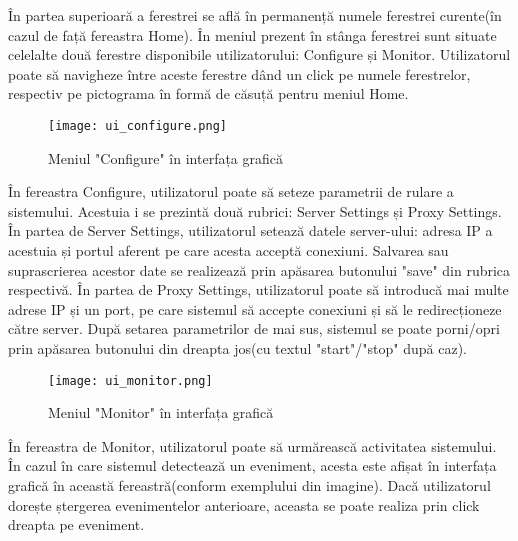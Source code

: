 În partea superioară a ferestrei se află în permanență numele ferestrei curente(în cazul de față fereastra Home). În meniul prezent în stânga ferestrei sunt situate celelalte două ferestre disponibile utilizatorului: Configure și Monitor. Utilizatorul poate să navigheze între aceste ferestre dând un click pe numele ferestrelor, respectiv pe pictograma în formă de căsuță pentru meniul Home.  \\

\begin{figure}[h]
	\centering
	\texttt{[image: ui\_configure.png]}
	\caption{ Meniul "Configure" în interfața grafică }
	\label{fig:ui_configure}
\end{figure}

În fereastra Configure, utilizatorul poate să seteze parametrii de rulare a sistemului. Acestuia i se prezintă două rubrici: Server Settings și Proxy Settings. În partea de Server Settings, utilizatorul setează datele server-ului: adresa IP a acestuia și portul aferent pe care acesta acceptă conexiuni. Salvarea sau suprascrierea acestor date se realizează prin apăsarea butonului "save" din rubrica respectivă. În partea de Proxy Settings, utilizatorul poate să introducă mai multe adrese IP și un port, pe care sistemul să accepte conexiuni și să le redirecționeze către server. După setarea parametrilor de mai sus, sistemul se poate porni/opri prin apăsarea butonului din dreapta jos(cu textul "start"/"stop" după caz). 
\newpage
\begin{figure}[h]
	\centering
	\texttt{[image: ui\_monitor.png]}
	\caption{ Meniul "Monitor" în interfața grafică }
	\label{fig:ui_monitor}
\end{figure}

În fereastra de Monitor, utilizatorul poate să urmărească activitatea sistemului. În cazul în care sistemul detectează un eveniment, acesta este afișat în interfața grafică în această fereastră(conform exemplului din imagine). Dacă utilizatorul dorește ștergerea evenimentelor anterioare, aceasta se poate realiza prin click dreapta pe eveniment. 